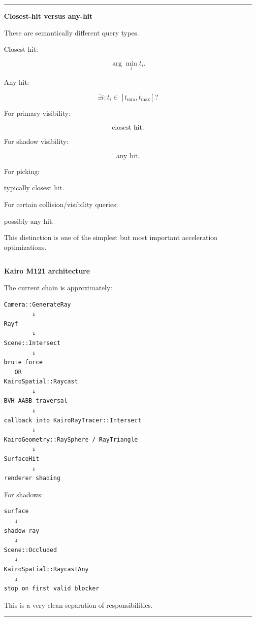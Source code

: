 \begin{center}\rule{0.5\linewidth}{0.5pt}\end{center}

\textbf{Closest-hit versus any-hit}

These are semantically different query types.

Closest hit:

\[
\boxed{
\arg\min_{i}
t_i.
}
\]

Any hit:

\[
\boxed{
\exists i:t_i\in[t_{\min},t_{\max}]?
}
\]

For primary visibility:

\[
\text{closest hit}.
\]

For shadow visibility:

\[
\text{any hit}.
\]

For picking:

typically closest hit.

For certain collision/visibility queries:

possibly any hit.

This distinction is one of the simplest but most important acceleration optimizations.

\begin{center}\rule{0.5\linewidth}{0.5pt}\end{center}

\textbf{Kairo M121 architecture}

The current chain is approximately:

\begin{verbatim}
Camera::GenerateRay
        ↓
Rayf
        ↓
Scene::Intersect
        ↓
brute force
   OR
KairoSpatial::Raycast
        ↓
BVH AABB traversal
        ↓
callback into KairoRayTracer::Intersect
        ↓
KairoGeometry::RaySphere / RayTriangle
        ↓
SurfaceHit
        ↓
renderer shading
\end{verbatim}

For shadows:

\begin{verbatim}
surface
   ↓
shadow ray
   ↓
Scene::Occluded
   ↓
KairoSpatial::RaycastAny
   ↓
stop on first valid blocker
\end{verbatim}

This is a very clean separation of responsibilities.

\begin{center}\rule{0.5\linewidth}{0.5pt}\end{center}

